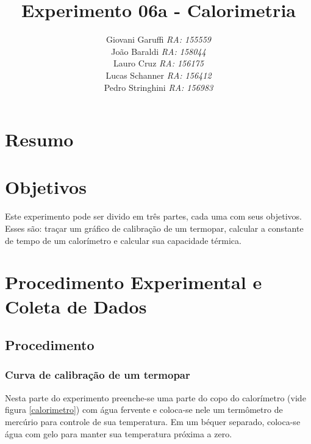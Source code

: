 \documentclass[12pt,a4paper]{article}
\begin{document}
\title{\vspace{70mm}\Huge Experimento 06a - Calorimetria}
\author{ Giovani Garuffi\qquad\hfill
		\textit {RA: 155559}\protect\\
		João Baraldi\hfill
		\textit{RA: 158044}\protect\\
		Lauro Cruz\hfill
		\textit{RA: 156175}\protect\\
		Lucas Schanner\hfill
		\textit{RA: 156412}\protect\\
		Pedro Stringhini\hfill
		\textit {RA: 156983}								
		}
\maketitle
\newpage
\section{Resumo}


\section{Objetivos}
Este experimento pode ser divido em três partes, cada uma com seus objetivos. Esses são: traçar um gráfico de calibração de um termopar, calcular a constante de tempo de um calorímetro e calcular sua capacidade térmica.


\section{Procedimento Experimental e Coleta de Dados}


\subsection{Procedimento}


\subsubsection{Curva de calibração de um termopar}

Nesta parte do experimento preenche-se uma parte do copo do calorímetro (vide figura \ref{calorimetro}) com água fervente e coloca-se nele um termômetro de mercúrio para controle de sua temperatura. Em um béquer separado, coloca-se água com gelo para manter sua temperatura próxima a zero.\\
\end{document}
